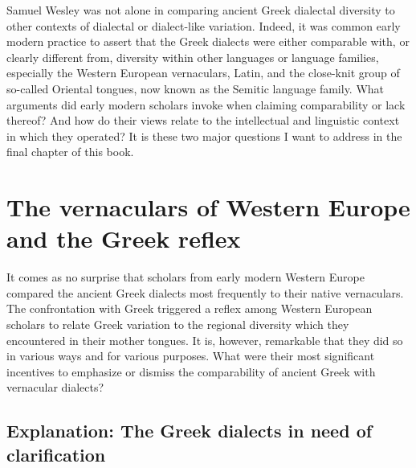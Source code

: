 Samuel Wesley was not alone in comparing ancient Greek dialectal diversity to other contexts of dialectal or dialect-like variation. Indeed, it was common early modern practice to assert that the Greek dialects were either comparable with, or clearly different from, diversity within other languages or language families, especially the Western European vernaculars, Latin, and the close-knit group of so-called Oriental tongues, now known as the Semitic language family. What arguments did early modern scholars invoke when claiming comparability or lack thereof? And how do their views relate to the intellectual and linguistic context in which they operated? It is these two major questions I want to address in the final chapter of this book.

\section{The vernaculars of Western Europe and the Greek reflex}

It comes as no surprise that scholars from early modern Western Europe compared the ancient Greek dialects most frequently to their native vernaculars. The confrontation with Greek triggered a reflex among Western European scholars to relate Greek variation to the regional diversity which they encountered in their mother tongues. It is, however, remarkable that they did so in various ways and for various purposes. What were their most significant incentives to emphasize or dismiss the comparability of ancient Greek with vernacular dialects?

\subsection{Explanation: The Greek dialects in need of clarification}

